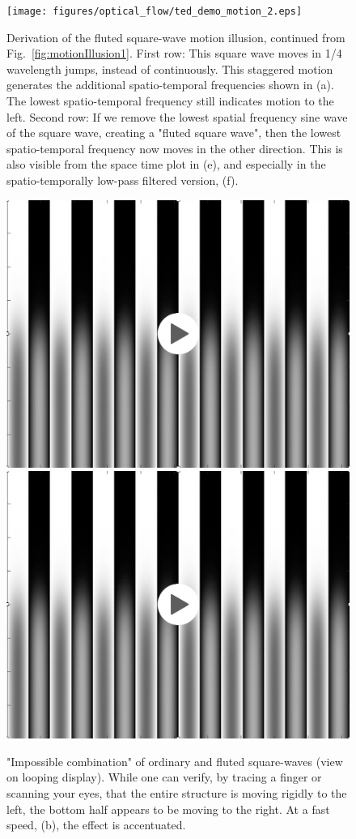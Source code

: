 \begin{figure}
\centerline{
\texttt{[image: figures/optical\_flow/ted\_demo\_motion\_2.eps]}
} 
\caption{Derivation of the fluted square-wave motion illusion, continued from Fig.~\ref{fig:motionIllusion1}.  First row:  This square wave moves in 1/4 wavelength jumps, instead of continuously.  This staggered motion generates the additional spatio-temporal frequencies shown in (a).  The lowest spatio-temporal frequency still indicates motion to the left.  Second row:  If we remove the lowest spatial frequency sine wave of the square wave, creating a "fluted square wave", then the lowest spatio-temporal frequency now moves in the other direction.  This is also visible from the space time plot in (e), and especially in the spatio-temporally low-pass filtered version, (f).}
\label{fig:motionIllusion2}
\end{figure}



\begin{figure}
\centerline{
{
\href{https://groups.csail.mit.edu/vision/cvbook/videos/blendedSlowLoop.mov}{\includegraphics[width=0.5\linewidth]{figures/temporal_filters/blendFrame.jpg}}}
{
\href{https://groups.csail.mit.edu/vision/cvbook/videos/fastBlendLoop.mov}{\includegraphics[width=0.5\linewidth]{figures/temporal_filters/blendFrame.jpg}}}
}
\caption{"Impossible combination" of ordinary and  fluted square-waves (view on looping display).  While one can verify, by tracing a finger or scanning your eyes, that the entire structure is moving rigidly to the left, the bottom half appears to be moving to the right.  At a fast speed, (b), the effect is accentuated.}
\label{fig:blends}
\end{figure}



